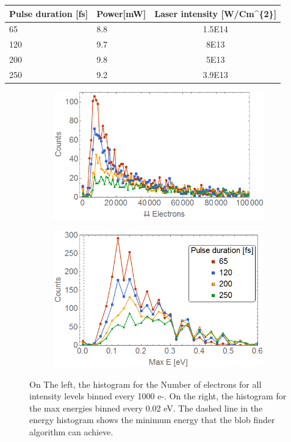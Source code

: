    
\begin{table}[]
\centering
\label{tab:pulsepower}
\begin{tabular}{|l|l|c|}
\hline
Pulse duration {[}fs{]} & \multicolumn{1}{c|}{Power{[}mW{]}} & Laser intensity {[}W/Cm\textasciicircum{}\{2\}{]} \\ \hline
65 & 8.8 & 1.5E14 \\ \hline
120 & 9.7 & 8E13 \\ \hline
200 & 9.8 & 5E13 \\ \hline
250 & 9.2 & 3.9E13 \\ \hline
\end{tabular}
\end{table}


\begin{figure}[h!]
\centering
\begin{subfigure}[l]{0.49\textwidth}
\includegraphics[width=1\textwidth]{../Images/results/MIR_He_pulsescan/raw/histoElec.png} 
\end{subfigure}
\begin{subfigure}[l]{0.49\textwidth}
\includegraphics[width=1\textwidth]{../Images/results/MIR_He_pulsescan/raw/histoEnergc.png}   				\end{subfigure}
\caption[MIR He-intensity dependence. Histogram]{On The left, the histogram for the Number of electrons for all intensity levels binned every 1000 e-. On the right, the histogram for the max energies binned every 0.02 eV. The dashed line in the energy histogram shows the minimum energy that the blob finder algorithm can achieve.}
\label{fig:intehisto}
\end{figure}


